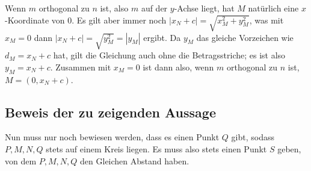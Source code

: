 Wenn $m$ orthogonal zu $n$ ist, also $m$ auf der $y$-Achse liegt, hat $M$ natürlich eine $x$-Koordinate von 0. 
Es gilt aber immer noch $|x_N+c|=\sqrt{x_M^2+y_M^2}$, was mit $x_M=0$ dann $|x_N+c|=\sqrt{y_M^2}=|y_M|$ ergibt. Da 
$y_M$ das gleiche Vorzeichen wie $d_M=x_N+c$ hat, gilt die Gleichung auch ohne die Betragsstriche; es ist also $y_M
=x_N+c$. Zusammen mit $x_M=0$ ist dann also, wenn $m$ orthogonal zu $n$ ist, $M=(0, x_N+c)$.

\subsection*{Beweis der zu zeigenden Aussage}

Nun muss nur noch bewiesen werden, dass es einen Punkt $Q$ gibt, sodass $P, M, N, Q$ stets auf einem Kreis liegen. 
Es muss also stets einen Punkt $S$ geben, von dem $P, M, N, Q$ den Gleichen Abstand haben.

